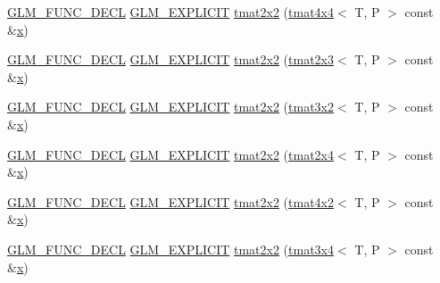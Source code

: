 \begin{DoxyCompactItemize}
\item 
\mbox{\hyperlink{setup_8hpp_ab2d052de21a70539923e9bcbf6e83a51}{G\+L\+M\+\_\+\+F\+U\+N\+C\+\_\+\+D\+E\+CL}} \mbox{\hyperlink{setup_8hpp_a6c74f5a5e7b134ab69023ff9a30d4d5d}{G\+L\+M\+\_\+\+E\+X\+P\+L\+I\+C\+IT}} \mbox{\hyperlink{structglm_1_1tmat2x2_a8da598daa30e0df8eba907c63cff1e7a}{tmat2x2}} (\mbox{\hyperlink{structglm_1_1tmat4x4}{tmat4x4}}$<$ T, P $>$ const \&\mbox{\hyperlink{glad_8h_a92d0386e5c19fb81ea88c9f99644ab1d}{x}})
\item 
\mbox{\hyperlink{setup_8hpp_ab2d052de21a70539923e9bcbf6e83a51}{G\+L\+M\+\_\+\+F\+U\+N\+C\+\_\+\+D\+E\+CL}} \mbox{\hyperlink{setup_8hpp_a6c74f5a5e7b134ab69023ff9a30d4d5d}{G\+L\+M\+\_\+\+E\+X\+P\+L\+I\+C\+IT}} \mbox{\hyperlink{structglm_1_1tmat2x2_ac50ef056ce996b1af6066382eeb49a4f}{tmat2x2}} (\mbox{\hyperlink{structglm_1_1tmat2x3}{tmat2x3}}$<$ T, P $>$ const \&\mbox{\hyperlink{glad_8h_a92d0386e5c19fb81ea88c9f99644ab1d}{x}})
\item 
\mbox{\hyperlink{setup_8hpp_ab2d052de21a70539923e9bcbf6e83a51}{G\+L\+M\+\_\+\+F\+U\+N\+C\+\_\+\+D\+E\+CL}} \mbox{\hyperlink{setup_8hpp_a6c74f5a5e7b134ab69023ff9a30d4d5d}{G\+L\+M\+\_\+\+E\+X\+P\+L\+I\+C\+IT}} \mbox{\hyperlink{structglm_1_1tmat2x2_a06366377c97a00ee72ba66718ab92751}{tmat2x2}} (\mbox{\hyperlink{structglm_1_1tmat3x2}{tmat3x2}}$<$ T, P $>$ const \&\mbox{\hyperlink{glad_8h_a92d0386e5c19fb81ea88c9f99644ab1d}{x}})
\item 
\mbox{\hyperlink{setup_8hpp_ab2d052de21a70539923e9bcbf6e83a51}{G\+L\+M\+\_\+\+F\+U\+N\+C\+\_\+\+D\+E\+CL}} \mbox{\hyperlink{setup_8hpp_a6c74f5a5e7b134ab69023ff9a30d4d5d}{G\+L\+M\+\_\+\+E\+X\+P\+L\+I\+C\+IT}} \mbox{\hyperlink{structglm_1_1tmat2x2_ada3ffdd9349a053d27ffd29afa096618}{tmat2x2}} (\mbox{\hyperlink{structglm_1_1tmat2x4}{tmat2x4}}$<$ T, P $>$ const \&\mbox{\hyperlink{glad_8h_a92d0386e5c19fb81ea88c9f99644ab1d}{x}})
\item 
\mbox{\hyperlink{setup_8hpp_ab2d052de21a70539923e9bcbf6e83a51}{G\+L\+M\+\_\+\+F\+U\+N\+C\+\_\+\+D\+E\+CL}} \mbox{\hyperlink{setup_8hpp_a6c74f5a5e7b134ab69023ff9a30d4d5d}{G\+L\+M\+\_\+\+E\+X\+P\+L\+I\+C\+IT}} \mbox{\hyperlink{structglm_1_1tmat2x2_a470191296126147372f7ba04535e01fb}{tmat2x2}} (\mbox{\hyperlink{structglm_1_1tmat4x2}{tmat4x2}}$<$ T, P $>$ const \&\mbox{\hyperlink{glad_8h_a92d0386e5c19fb81ea88c9f99644ab1d}{x}})
\item 
\mbox{\hyperlink{setup_8hpp_ab2d052de21a70539923e9bcbf6e83a51}{G\+L\+M\+\_\+\+F\+U\+N\+C\+\_\+\+D\+E\+CL}} \mbox{\hyperlink{setup_8hpp_a6c74f5a5e7b134ab69023ff9a30d4d5d}{G\+L\+M\+\_\+\+E\+X\+P\+L\+I\+C\+IT}} \mbox{\hyperlink{structglm_1_1tmat2x2_abb5235dd0bc0f2aced04e5dcba22e040}{tmat2x2}} (\mbox{\hyperlink{structglm_1_1tmat3x4}{tmat3x4}}$<$ T, P $>$ const \&\mbox{\hyperlink{glad_8h_a92d0386e5c19fb81ea88c9f99644ab1d}{x}})

\end{DoxyCompactItemize}
